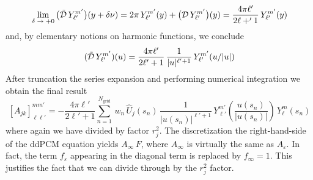\[
\lim_{\delta \; \to \; + 0} \big(\tilde{\mathcal{D}} \, Y_{\ell'}^{m'}\big)(y + \delta \nu) =  2\pi \,Y_{\ell'}^{m'}(y)+ \big( \mathcal{D} \, Y_{\ell'}^{m'} \big)(y) = \frac{4 \pi \ell'}{2 \ell +' 1} \, Y_{\ell'}^{m'}(y)
\]
and, by elementary notions on harmonic functions, we conclude
\[
(\tilde{\mathcal{D}} \, Y_{\ell'}^{m'})(u) = \frac{4 \pi \ell'}{2 \ell' + 1} \, \frac{1}{|u|^{\ell' + 1}} \,  Y_{\ell'}^{m'}(u/|u|)
\]
After truncation the series expansion and performing numerical integration we obtain the final result
\begin{equation}\label{eq:ajk}
[A_{jk}]_{\ell \ell'}^{m m'} =-  \frac{4 \pi \ell'}{2 \ell' + 1}  \sum_{n=1}^{N_\text{grid}} \, w_n  \,  \hat{U}_j(s_n) \, \frac{1}{|u(s_n)|^{\ell' + 1}} \, Y_{\ell'}^{m'}\left(\frac{u(s_n)}{|u(s_n)|}\right) \, Y_{\ell}^{m}(s_n)
\end{equation}
where again we have divided by factor $r_j^2$. The discretization the right-hand-side of the ddPCM equation yields $A_\infty \, F$, where $A_\infty$ is virtually the same as $A_\varepsilon$. In fact, the term $f_\varepsilon$ appearing in the diagonal term is replaced by $f_\infty = 1$. This justifies the fact that we can divide through by the $r_j^2$ factor.